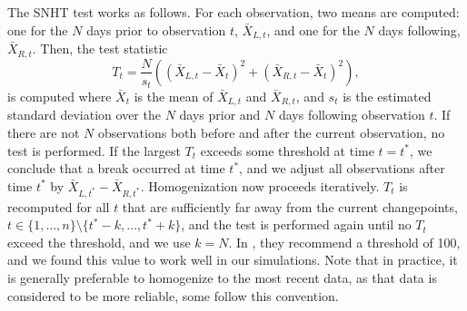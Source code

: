 \documentclass[12pt]{article}
\def\ni{\noindent}
\begin{document}
\begin{doublespacing}
The SNHT test works as follows.  For each observation, two means are computed: one for the $N$ days prior to observation $t$, $\bar{X}_{L,t}$, and one for the $N$ days following, $\bar{X}_{R,t}$.  Then, the test statistic
\begin{equation}
	T_t = \frac{N}{s_t}\left( (\bar{X}_{L,t}-\bar{X}_t)^2 + (\bar{X}_{R,t}-\bar{X}_t)^2\right),
	\label{eq:Hom}
\end{equation}
\ni is computed where $\bar{X}_t$ is the mean of $\bar{X}_{L,t}$ and $\bar{X}_{R,t}$, and $s_t$ is the estimated standard deviation over the $N$ days prior and $N$ days following observation $t$.  If there are not $N$ observations both before and after the current observation, no test is performed.  If the largest $T_t$ exceeds some threshold at time $t=t^*$, we conclude that a break occurred at time $t^*$, and we adjust all observations after time $t^*$ by $\bar{X}_{L,t^*}-\bar{X}_{R,t^*}$.  Homogenization now proceeds iteratively.  $T_t$ is recomputed for all $t$ that are sufficiently far away from the current changepoints, $t\in\{1,\ldots,n\} \setminus \{t^*-k, \ldots, t^*+k\}$, and the test is performed again until no $T_t$ exceed the threshold, and we use $k=N$.  In \cite{haimberger07}, they recommend a threshold of 100, and we found this value to work well in our simulations.  Note that in practice, it is generally preferable to homogenize to the most recent data, as that data is considered to be more reliable, some follow this convention.


\end{doublespacing}
\end{document}
